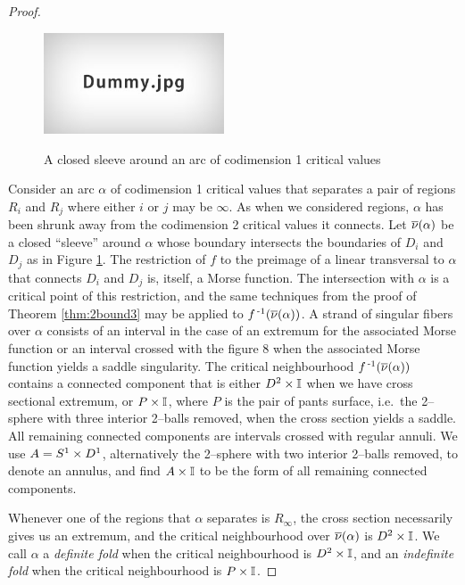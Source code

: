 \begin{proof}
	\begin{figure}
		\centering
		\captionsetup{justification=centering}
		\caption{A closed sleeve around an arc of codimension 1 critical values}
		\includegraphics[height=3cm]{figures/dummy.jpg}
		\label{fig:arcsleeve}
	\end{figure}
	
	Consider an arc $\alpha$ of codimension 1 critical values that separates a pair of regions $R_i$ and $R_j$ where either $i$ or $j$ may be $\infty$.
	As when we considered regions, $\alpha$ has been shrunk away from the codimension 2 critical values it connects.
	Let $\overline{\nu}(\alpha)$ be a closed ``sleeve'' around $\alpha$ whose boundary intersects the boundaries of $D_i$ and $D_j$ as in Figure \ref{fig:arcsleeve}.
	The restriction of $f$ to the preimage of a linear transversal to $\alpha$ that connects $D_i$ and $D_j$ is, itself, a Morse function.
	The intersection with $\alpha$ is a critical point of this restriction, and the same techniques from the proof of Theorem \ref{thm:2bound3} may be applied to $f^{\,\text{-}1}(\overline{\nu}(\alpha))$.
	A strand of singular fibers over $\alpha$ consists of an interval in the case of an extremum for the associated Morse function or an interval crossed with the figure 8 when the associated Morse function yields a saddle singularity.
	The critical neighbourhood $f^{\,\text{-}1}(\overline{\nu}(\alpha))$ contains a connected component that is either $D^2\times\mathbb{I}$ when we have cross sectional extremum, or $P\times\mathbb{I}$, where $P$ is the pair of pants surface, i.e.\ the 2--sphere with three interior 2--balls removed, when the cross section yields a saddle.
	All remaining connected components are intervals crossed with regular annuli.
	We use $A=S^1\times D^1$, alternatively the 2--sphere with two interior 2--balls removed, to denote an annulus, and find $A\times\mathbb{I}$ to be the form of all remaining connected components.
	
	Whenever one of the regions that $\alpha$ separates is $R_\infty$, the cross section necessarily gives us an extremum, and the critical neighbourhood over $\overline{\nu}(\alpha)$ is $D^2\times\mathbb{I}$.
	We call $\alpha$ a \emph{definite fold} when the critical neighbourhood is $D^2\times\mathbb{I}$, and an \emph{indefinite fold} when the critical neighbourhood is $P\times\mathbb{I}$.
	

\end{proof}
